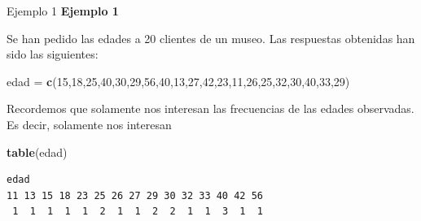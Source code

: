 \documentclass[
  ignorenonframetext,
]{beamer}
\newenvironment{Shaded}{\begin{snugshade}}{\end{snugshade}}
\newcommand{\DecValTok}[1]{\textcolor[rgb]{0.00,0.00,0.81}{#1}}
\newcommand{\FunctionTok}[1]{\textcolor[rgb]{0.13,0.29,0.53}{\textbf{#1}}}
\newcommand{\NormalTok}[1]{#1}
\newcommand{\OtherTok}[1]{\textcolor[rgb]{0.56,0.35,0.01}{#1}}
\begin{document}
\begin{frame}[fragile]{Ejemplo 1}
\label{ejemplo-1-8}
\textbf{Ejemplo 1}

Se han pedido las edades a 20 clientes de un museo. Las respuestas
obtenidas han sido las siguientes:

\begin{Shaded}
\begin{Highlighting}[]
\NormalTok{edad }\OtherTok{=} \FunctionTok{c}\NormalTok{(}\DecValTok{15}\NormalTok{,}\DecValTok{18}\NormalTok{,}\DecValTok{25}\NormalTok{,}\DecValTok{40}\NormalTok{,}\DecValTok{30}\NormalTok{,}\DecValTok{29}\NormalTok{,}\DecValTok{56}\NormalTok{,}\DecValTok{40}\NormalTok{,}\DecValTok{13}\NormalTok{,}\DecValTok{27}\NormalTok{,}\DecValTok{42}\NormalTok{,}\DecValTok{23}\NormalTok{,}\DecValTok{11}\NormalTok{,}\DecValTok{26}\NormalTok{,}\DecValTok{25}\NormalTok{,}\DecValTok{32}\NormalTok{,}\DecValTok{30}\NormalTok{,}\DecValTok{40}\NormalTok{,}\DecValTok{33}\NormalTok{,}\DecValTok{29}\NormalTok{)}
\end{Highlighting}
\end{Shaded}

Recordemos que solamente nos interesan las frecuencias de las edades
observadas. Es decir, solamente nos interesan

\begin{Shaded}
\begin{Highlighting}[]
\FunctionTok{table}\NormalTok{(edad)}
\end{Highlighting}
\end{Shaded}

\begin{verbatim}
edad
11 13 15 18 23 25 26 27 29 30 32 33 40 42 56 
 1  1  1  1  1  2  1  1  2  2  1  1  3  1  1 
\end{verbatim}
\end{frame}
\end{document}
